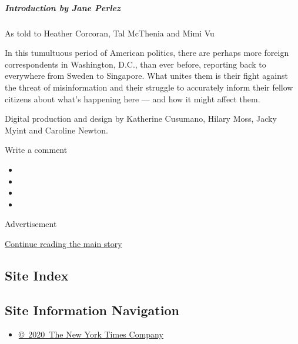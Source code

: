 \hypertarget{introduction-by-jane-perlez}{%
\subparagraph{Introduction by Jane
Perlez}\label{introduction-by-jane-perlez}}

As told to Heather Corcoran, Tal McThenia and Mimi Vu

In this tumultuous period of American politics, there are perhaps more
foreign correspondents in Washington, D.C., than ever before, reporting
back to everywhere from Sweden to Singapore. What unites them is their
fight against the threat of misinformation and their struggle to
accurately inform their fellow citizens about what's happening here ---
and how it might affect them.

Digital production and design by Katherine Cusumano, Hilary Moss, Jacky
Myint and Caroline Newton.

Write a comment

\begin{itemize}
\item
\item
\item
\item
\end{itemize}

Advertisement

\protect\hyperlink{after-bottom}{Continue reading the main story}

\hypertarget{site-index}{%
\subsection{Site Index}\label{site-index}}

\hypertarget{site-information-navigation}{%
\subsection{Site Information
Navigation}\label{site-information-navigation}}

\begin{itemize}
\tightlist
\item
  \href{https://help.nytimes.com/hc/en-us/articles/115014792127-Copyright-notice}{©~2020~The
  New York Times Company}
\end{itemize}

